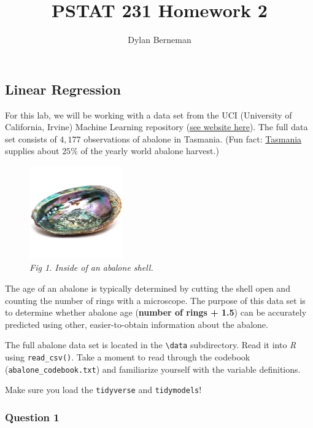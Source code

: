 \documentclass[
]{article}
\title{PSTAT 231 Homework 2}
\author{Dylan Berneman}
\date{}
\begin{document}
\maketitle

{
\setcounter{tocdepth}{2}
\tableofcontents
}
\hypertarget{linear-regression}{%
\subsection{Linear Regression}\label{linear-regression}}

For this lab, we will be working with a data set from the UCI
(University of California, Irvine) Machine Learning repository
(\href{http://archive.ics.uci.edu/ml/datasets/Abalone}{see website
here}). The full data set consists of \(4,177\) observations of abalone
in Tasmania. (Fun fact:
\href{https://en.wikipedia.org/wiki/Tasmania}{Tasmania} supplies about
\(25\%\) of the yearly world abalone harvest.)

\begin{figure}
\centering
\includegraphics[width=1.58333in,height=\textheight]{"abalone_pic.jpg"}
\caption{\emph{Fig 1. Inside of an abalone shell.}}
\end{figure}

The age of an abalone is typically determined by cutting the shell open
and counting the number of rings with a microscope. The purpose of this
data set is to determine whether abalone age (\textbf{number of rings +
1.5}) can be accurately predicted using other, easier-to-obtain
information about the abalone.

The full abalone data set is located in the
\texttt{\textbackslash{}data} subdirectory. Read it into \emph{R} using
\texttt{read\_csv()}. Take a moment to read through the codebook
(\texttt{abalone\_codebook.txt}) and familiarize yourself with the
variable definitions.

Make sure you load the \texttt{tidyverse} and \texttt{tidymodels}!

\hypertarget{question-1}{%
\subsubsection{Question 1}\label{question-1}}
\end{document}
